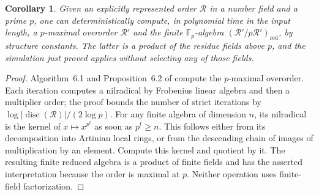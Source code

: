 \documentclass[11pt]{article}
\newtheorem{corollary}[theorem]{Corollary}
\theoremstyle{definition}
\theoremstyle{remark}
\begin{document}
\begin{corollary}\label{cor:pmax-etale-interface}
Given an explicitly represented order \(\mathcal R\) in a number field
and a prime \(p\), one can deterministically compute, in polynomial time
in the input length, a \(p\)-maximal overorder \(\mathcal R'\) and the
finite \(\mathbb F_p\)-algebra
\((\mathcal R'/p\mathcal R')_{\mathrm{red}}\), by structure constants.
The latter is a product of the residue fields above \(p\), and the
simulation just proved applies without selecting any of those fields.
\end{corollary}
\begin{proof}
Algorithm~6.1 and Proposition~6.2 of
\citet[pp.~246--247]{BuchmannLenstra1994} compute the
\(p\)-maximal overorder. Each iteration computes a nilradical by
Frobenius linear algebra and then a multiplier order; the proof bounds
the number of strict iterations by
\(\log|\operatorname{disc}(\mathcal R)|/(2\log p)\).
For any finite algebra of dimension \(n\), its nilradical is the kernel
of \(x\mapsto x^{p^t}\) as soon as \(p^t\geq n\). This follows either
from its decomposition into Artinian local rings, or from the descending
chain of images of multiplication by an element. Compute this kernel
and quotient by it. The resulting finite reduced algebra is a product
of finite fields and has the asserted interpretation because the order
is maximal at \(p\). Neither operation uses finite-field factorization.
\end{proof}
\end{document}
